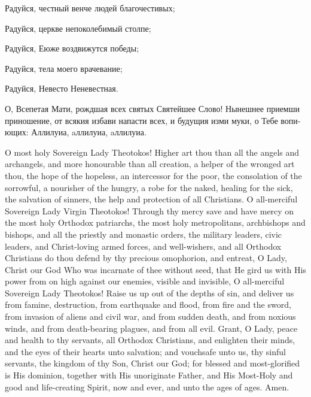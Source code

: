 \pagebreak

\begin{russian}

  Радуйся, честный венче людей благочестивых;


  Радуйся, церкве непоколебимый столпе;


  Радуйся, Еюже воздвижутся победы;


  Радуйся, тела моего врачевание;


  Радуйся, Невесто Неневестная.


  О, Всепетая Мати, рождшая всех святых Святейшее Слово! Нынешнее приемши приношение, от всякия избави напасти всех, и будущия изми муки, о Тебе вопиющих: Аллилуиа, aллилуиа, aллилуиа. \Trizhdy

\end{russian}

\pagebreak

\begin{center}
  {\color{Maroon}{\large Prayer Following Akathist}}
\end{center}

\Priest O most holy Sovereign Lady Theotokos! Higher art thou than all the angels and archangels, and more honourable than all creation, a helper of the wronged art thou, the hope of the hopeless, an intercessor for the poor, the consolation of the sorrowful, a nourisher of the hungry, a robe for the naked, healing for the sick, the salvation of sinners, the help and protection of all Christians. O all-merciful Sovereign Lady Virgin Theotokos! Through thy mercy save and have mercy on the most holy Orthodox patriarchs, the most holy metropolitans, archbishops and bishops, and all the priestly and monastic orders, the military leaders, civic leaders, and Christ-loving armed forces, and well-wishers, and all Orthodox Christians do thou defend by thy precious omophorion, and entreat, O Lady, Christ our God Who was incarnate of thee without seed, that He gird us with His power from on high against our enemies, visible and invisible, O all-merciful Sovereign Lady Theotokos! Raise us up out of the depths of sin, and deliver us from famine, destruction, from earthquake and flood, from fire and the sword, from invasion of aliens and civil war, and from sudden death, and from noxious winds, and from death-bearing plagues, and from all evil. Grant, O Lady, peace and health to thy servants, all Orthodox Christians, and enlighten their minds, and the eyes of their hearts unto salvation; and vouchsafe unto us, thy sinful servants, the kingdom of thy Son, Christ our God; for blessed and most-glorified is His dominion, together with His unoriginate Father, and His Most-Holy and good and life-creating Spirit, now and ever, and unto the ages of ages. Amen.

